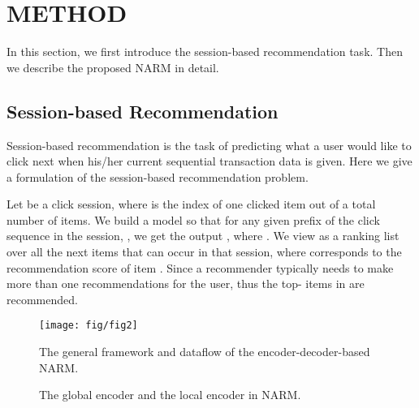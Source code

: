 \documentclass[sigconf]{acmart}
\begin{document}
\section{METHOD}

In this section, we first introduce the session-based recommendation task. Then we describe the proposed NARM in detail.
  
\subsection{Session-based Recommendation}
Session-based recommendation is the task of predicting what a user would like to click next when his/her current sequential transaction data is given. Here we give a formulation of the session-based recommendation problem.
  
Let  be a click session, where  is the index of one clicked item out of a total number of  items. We build a model  so that for any given prefix of the click sequence in the session, , we get the output , where . We view  as a ranking list over all the next items that can occur in that session, where  corresponds to the recommendation score of item . Since a recommender typically needs to make more than one recommendations for the user, thus the top-  items in  are recommended. 
  
    \begin{figure}
  	    \vspace{1em}
	    \centering
	    \texttt{[image: fig/fig2]}
	    \caption{The general framework and dataflow of the encoder-decoder-based NARM.}
    \end{figure}
  
    \begin{figure*}
	    \centering
        \hspace{3.3em}
        \caption{The global encoder and the local encoder in NARM.}
    \end{figure*}
         
\end{document}
